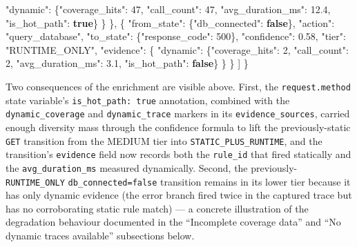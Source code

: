 \documentclass[
]{article}
\newenvironment{Shaded}{}{}
\newcommand{\DataTypeTok}[1]{\textcolor[rgb]{0.56,0.13,0.00}{#1}}
\newcommand{\DecValTok}[1]{\textcolor[rgb]{0.25,0.63,0.44}{#1}}
\newcommand{\FloatTok}[1]{\textcolor[rgb]{0.25,0.63,0.44}{#1}}
\newcommand{\FunctionTok}[1]{\textcolor[rgb]{0.02,0.16,0.49}{#1}}
\newcommand{\KeywordTok}[1]{\textcolor[rgb]{0.00,0.44,0.13}{\textbf{#1}}}
\newcommand{\OtherTok}[1]{\textcolor[rgb]{0.00,0.44,0.13}{#1}}
\newcommand{\StringTok}[1]{\textcolor[rgb]{0.25,0.44,0.63}{#1}}
\begin{document}
\begin{Shaded}
\begin{Highlighting}[]
        \DataTypeTok{"dynamic"}\FunctionTok{:} \FunctionTok{\{}\DataTypeTok{"coverage\_hits"}\FunctionTok{:} \DecValTok{47}\FunctionTok{,} \DataTypeTok{"call\_count"}\FunctionTok{:} \DecValTok{47}\FunctionTok{,}
                    \DataTypeTok{"avg\_duration\_ms"}\FunctionTok{:} \FloatTok{12.4}\FunctionTok{,} \DataTypeTok{"is\_hot\_path"}\FunctionTok{:} \KeywordTok{true}\FunctionTok{\}}
      \FunctionTok{\}}
    \FunctionTok{\}}\OtherTok{,}
    \FunctionTok{\{}
      \DataTypeTok{"from\_state"}\FunctionTok{:} \FunctionTok{\{}\DataTypeTok{"db\_connected"}\FunctionTok{:} \KeywordTok{false}\FunctionTok{\},}
      \DataTypeTok{"action"}\FunctionTok{:} \StringTok{"query\_database"}\FunctionTok{,}
      \DataTypeTok{"to\_state"}\FunctionTok{:} \FunctionTok{\{}\DataTypeTok{"response\_code"}\FunctionTok{:} \DecValTok{500}\FunctionTok{\},}
      \DataTypeTok{"confidence"}\FunctionTok{:} \FloatTok{0.58}\FunctionTok{,} \DataTypeTok{"tier"}\FunctionTok{:} \StringTok{"RUNTIME\_ONLY"}\FunctionTok{,}
      \DataTypeTok{"evidence"}\FunctionTok{:} \FunctionTok{\{}
        \DataTypeTok{"dynamic"}\FunctionTok{:} \FunctionTok{\{}\DataTypeTok{"coverage\_hits"}\FunctionTok{:} \DecValTok{2}\FunctionTok{,} \DataTypeTok{"call\_count"}\FunctionTok{:} \DecValTok{2}\FunctionTok{,}
                    \DataTypeTok{"avg\_duration\_ms"}\FunctionTok{:} \FloatTok{3.1}\FunctionTok{,} \DataTypeTok{"is\_hot\_path"}\FunctionTok{:} \KeywordTok{false}\FunctionTok{\}}
      \FunctionTok{\}}
    \FunctionTok{\}}
  \OtherTok{]}
\FunctionTok{\}}
\end{Highlighting}
\end{Shaded}

Two consequences of the enrichment are visible above. First, the
\texttt{request.method} state variable's \texttt{is\_hot\_path:\ true}
annotation, combined with the \texttt{dynamic\_coverage} and
\texttt{dynamic\_trace} markers in its \texttt{evidence\_sources},
carried enough diversity mass through the confidence formula to lift the
previously-static \texttt{GET} transition from the MEDIUM tier into
\texttt{STATIC\_PLUS\_RUNTIME}, and the transition's \texttt{evidence}
field now records both the \texttt{rule\_id} that fired statically and
the \texttt{avg\_duration\_ms} measured dynamically. Second, the
previously-\texttt{RUNTIME\_ONLY} \texttt{db\_connected=false}
transition remains in its lower tier because it has only dynamic
evidence (the error branch fired twice in the captured trace but has no
corroborating static rule match) --- a concrete illustration of the
degradation behaviour documented in the ``Incomplete coverage data'' and
``No dynamic traces available'' subsections below.
\end{document}
